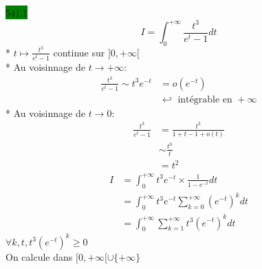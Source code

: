 \documentclass{article}
\begin{document}
  
\noindent \colorbox{green}{541.1}\\
\begin{equation*}
    I = \int_{0}^{+\infty}\frac{t^{3}}{e^{t}-1}dt 
\end{equation*}
* \(t \mapsto \frac{t^{3}}{e^{t}-1}\) continue sur \(]0, +\infty[\)\\
* Au voisinnage de \(t \rightarrow +\infty\): 
\begin{align*}
  \frac{t^{3}}{e^{t}-1} \sim t^{3}e^{-t} &= o(e^{-t})\\
                                         &\hookleftarrow \text{ intégrable en } +\infty
\end{align*}
* Au voisinnage de \(t \rightarrow 0\): 
\begin{align*}
  \frac{t^{3}}{e^{t}-1} &= \frac{t^{3}}{1 + t - 1 + o(t)} \\
    &\sim \frac{t^{3}}{t} \\
    &= t^{2}
\end{align*}
\begin{align*}
  I &= \int_{0}^{+\infty}t^{3}e^{-t}\times \frac{1}{1-e^{-t}}dt \\
    &= \int_{0}^{+\infty}t^{3}e^{-t}\sum_{k=0}^{+\infty}(e^{-t})^{k}dt\\
    &= \int_{0}^{+\infty}\sum_{k=1}^{+\infty}t^{3}(e^{-t})^{k}dt
\end{align*}
\(\forall k, t, t^{3}(e^{-t})^{k} \geq 0\)\\
On calcule dans \([0, +\infty[\cup\{+\infty\}\)
\end{document}

